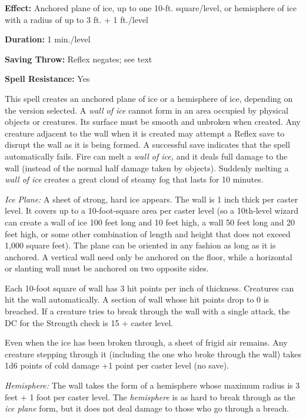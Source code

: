 \documentclass{article}
\begin{document}
\textbf{Effect:} Anchored plane of ice, up to one 10-ft. square/level, or hemisphere 
of ice with a radius of up to 3 ft. + 1 ft./level

\textbf{Duration:} 1 min./level

\textbf{Saving Throw:} Reflex negates; see text

\textbf{Spell Resistance:} Yes

This spell creates an anchored plane of ice or a hemisphere of ice, depending on 
the version selected. A \textit{wall of ice }cannot form in an area occupied by 
physical objects or creatures. Its surface must be smooth and unbroken when created. 
Any creature adjacent to the wall when it is created may attempt a Reflex save 
to disrupt the wall as it is being formed. A successful save indicates that the 
spell automatically fails. Fire can melt a \textit{wall of ice, }and it deals full 
damage to the wall (instead of the normal half damage taken by objects). Suddenly 
melting a \textit{wall of ice }creates a great cloud of steamy fog that lasts for 
10 minutes.

\textit{Ice Plane: }A sheet of strong, hard ice appears. The wall is 1 inch thick 
per caster level. It covers up to a 10-foot-square area per caster level (so a 
10th-level wizard can create a wall of ice 100 feet long and 10 feet high, a wall 
50 feet long and 20 feet high, or some other combination of length and height that 
does not exceed 1,000 square feet). The plane can be oriented in any fashion as 
long as it is anchored. A vertical wall need only be anchored on the floor, while 
a horizontal or slanting wall must be anchored on two opposite sides.

Each 10-foot square of wall has 3 hit points per inch of thickness. Creatures can 
hit the wall automatically. A section of wall whose hit points drop to 0 is breached. 
If a creature tries to break through the wall with a single attack, the DC for 
the Strength check is 15 + caster level.

Even when the ice has been broken through, a sheet of frigid air remains. Any creature 
stepping through it (including the one who broke through the wall) takes 1d6 points 
of cold damage +1 point per caster level (no save).

\textit{Hemisphere: }The wall takes the form of a hemisphere whose maximum radius 
is 3 feet + 1 foot per caster level. The \textit{hemisphere }is as hard to break 
through as the \textit{ice plane }form, but it does not deal damage to those who 
go through a breach.
\end{document}
